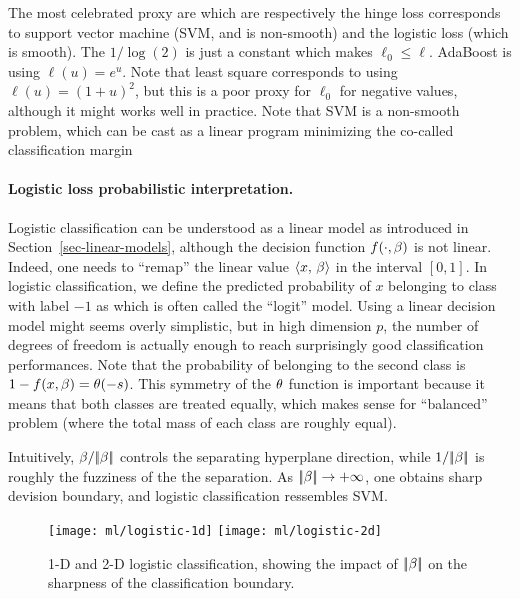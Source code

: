 The most celebrated proxy are 
which are respectively the hinge loss corresponds to support vector machine (SVM, and is non-smooth) and the logistic loss (which is smooth). The $1/\log(2)$ is just a constant which makes $\ell_0 \leq \ell$.
% 
AdaBoost is using $\ell(u)=e^u$.
%
Note that least square corresponds to using $\ell(u)=(1+u)^2$, but this is a poor proxy for $\ell_0$ for negative values, although it might works well in practice.
% 
Note that SVM is a non-smooth problem, which can be cast as a linear program minimizing the co-called classification margin 


\paragraph{Logistic loss probabilistic interpretation.}

Logistic classification can be understood as a linear model as introduced in Section~\ref{sec-linear-models}, although the decision function $f(\cdot,\beta)$ is not linear. Indeed, one needs to ``remap'' the linear value $\langle x,\,\beta\rangle$ in the interval $[0,1]$. In logistic classification, we define the predicted probability of $x$ belonging to class with label $-1$ as 
which is often called the ``logit'' model.
%
Using a linear decision model might seems overly simplistic, but in high dimension $p$, the number of degrees of freedom is actually enough to reach surprisingly good classification performances.
%
Note that the probability of belonging to the second class is $1-f(x,\beta)=\theta(-s)$. This symmetry of the $\theta$ function is important because it means that both classes are treated equally, which makes sense for ``balanced'' problem (where the total mass of each class are roughly equal).

Intuitively, $\beta/|\!| \beta |\!|$ controls the separating hyperplane direction, while $1/|\!| \beta |\!|$ is roughly the fuzziness of the the separation. As $|\!| \beta |\!| \rightarrow +\infty$, one obtains sharp devision boundary, and logistic classification ressembles SVM.

\begin{figure}
\centering
\texttt{[image: ml/logistic-1d]}\qquad
\texttt{[image: ml/logistic-2d]}
\caption{\label{fig-losses}
1-D and 2-D logistic classification, showing the impact of $|\!| \beta |\!|$ on the sharpness of the classification boundary.
}
\end{figure}


